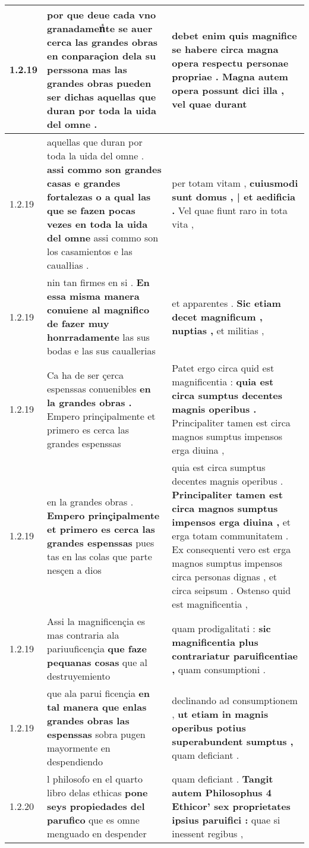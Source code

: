 \begin{tabular}{|p{1cm}|p{6.5cm}|p{6.5cm}|}
1.2.19 & por que deue cada vno granadamenᷤte se auer cerca las grandes obras en conparaçion dela su perssona \textbf{ mas las grandes obras pueden ser dichas } aquellas que duran por toda la uida del omne . & debet enim quis magnifice se habere circa magna opera respectu personae propriae . \textbf{ Magna autem opera possunt dici illa , } vel quae durant \\\hline
1.2.19 & aquellas que duran por toda la uida del omne . \textbf{ assi commo son grandes casas e grandes fortalezas o a qual las que se fazen pocas vezes en toda la uida del omne } assi commo son los casamientos e las caualłias . & per totam vitam , \textbf{ cuiusmodi sunt domus , | et aedificia . } Vel quae fiunt raro in tota vita , \\\hline
1.2.19 & nin tan firmes en si . \textbf{ En essa misma manera conuiene al magnifico de fazer muy honrradamente } las sus bodas e las sus cauallerias & et apparentes . \textbf{ Sic etiam decet magnificum , nuptias , } et militias , \\\hline
1.2.19 & Ca ha de ser çerca espenssas conuenibles \textbf{ en la grandes obras . } Empero prinçipalmente et primero es cerca las grandes espenssas & Patet ergo circa quid est magnificentia : \textbf{ quia est circa sumptus decentes magnis operibus . } Principaliter tamen est circa magnos sumptus impensos erga diuina , \\\hline
1.2.19 & en la grandes obras . \textbf{ Empero prinçipalmente et primero es cerca las grandes espenssas } pues tas en las colas que parte nesçen a dios & quia est circa sumptus decentes magnis operibus . \textbf{ Principaliter tamen est circa magnos sumptus impensos erga diuina , } et erga totam communitatem . Ex consequenti vero est erga magnos sumptus impensos circa personas dignas , et circa seipsum . Ostenso quid est magnificentia , \\\hline
1.2.19 & Assi la magnificençia es mas contraria ala pariuuficençia \textbf{ que faze pequanas cosas } que al destruyemiento & quam prodigalitati : \textbf{ sic magnificentia plus contrariatur paruificentiae , } quam consumptioni . \\\hline
1.2.19 & que ala parui ficençia \textbf{ en tal manera que enlas grandes obras las espenssas } sobra pugen mayormente en despendiendo & declinando ad consumptionem , \textbf{ ut etiam in magnis operibus potius superabundent sumptus , } quam deficiant . \\\hline
1.2.20 & l philosofo en el quarto libro delas ethicas \textbf{ pone seys propiedades del parufico } que es omne menguado en despender & quam deficiant . \textbf{ Tangit autem Philosophus 4 Ethicor’ sex proprietates ipsius paruifici : } quae si inessent regibus , \\\hline

\end{tabular}
